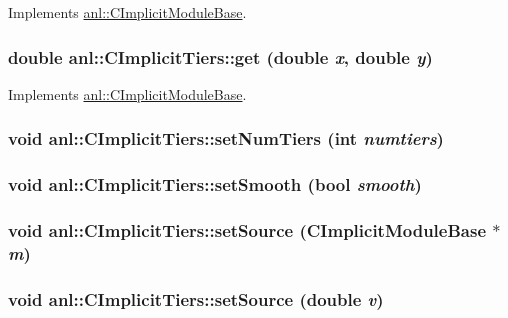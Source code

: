 Implements \hyperlink{classanl_1_1CImplicitModuleBase_ac17d592612c82ba3d47f9229a00b1fe3}{anl::CImplicitModuleBase}.\hypertarget{classanl_1_1CImplicitTiers_a497494a60352ce9490ddd28125beb01a}{
\subsubsection[{get}]{\setlength{\rightskip}{0pt plus 5cm}double anl::CImplicitTiers::get (double {\em x}, \/  double {\em y})}}
\label{classanl_1_1CImplicitTiers_a497494a60352ce9490ddd28125beb01a}


Implements \hyperlink{classanl_1_1CImplicitModuleBase_ab88f8a1822dcfbc13ba5230318b0acd1}{anl::CImplicitModuleBase}.\hypertarget{classanl_1_1CImplicitTiers_a9e279587e75fad5db248fca3cb8ce0a1}{
\subsubsection[{setNumTiers}]{\setlength{\rightskip}{0pt plus 5cm}void anl::CImplicitTiers::setNumTiers (int {\em numtiers})}}
\label{classanl_1_1CImplicitTiers_a9e279587e75fad5db248fca3cb8ce0a1}
\hypertarget{classanl_1_1CImplicitTiers_a8d90e5c2032ceb397c3186f6e4f836f0}{
\subsubsection[{setSmooth}]{\setlength{\rightskip}{0pt plus 5cm}void anl::CImplicitTiers::setSmooth (bool {\em smooth})}}
\label{classanl_1_1CImplicitTiers_a8d90e5c2032ceb397c3186f6e4f836f0}
\hypertarget{classanl_1_1CImplicitTiers_aab6ab1f4ba22c000701c8aa3c8c60fa3}{
\subsubsection[{setSource}]{\setlength{\rightskip}{0pt plus 5cm}void anl::CImplicitTiers::setSource ({\bf CImplicitModuleBase} $\ast$ {\em m})}}
\label{classanl_1_1CImplicitTiers_aab6ab1f4ba22c000701c8aa3c8c60fa3}
\hypertarget{classanl_1_1CImplicitTiers_af22ec08e2314b38ab6d7f539ffde8728}{
\subsubsection[{setSource}]{\setlength{\rightskip}{0pt plus 5cm}void anl::CImplicitTiers::setSource (double {\em v})}}
\label{classanl_1_1CImplicitTiers_af22ec08e2314b38ab6d7f539ffde8728}



